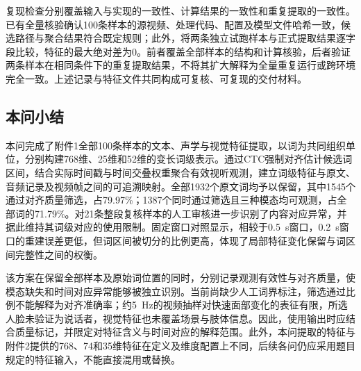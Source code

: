 复现检查分别覆盖输入与实现的一致性、计算结果的一致性和重复提取的一致性。已有全量核验确认100条样本的源视频、处理代码、配置及模型文件哈希一致，候选路径与聚合结果符合既定规则；此外，将两条独立试跑样本与正式提取结果逐字段比较，特征的最大绝对差为0。前者覆盖全部样本的结构和计算核验，后者验证两条样本在相同条件下的重复提取结果，不将其扩大解释为全量重复运行或跨环境完全一致。上述记录与特征文件共同构成可复核、可复现的交付材料。

\subsection{本问小结}

本问完成了附件1全部100条样本的文本、声学与视觉特征提取，以词为共同组织单位，分别构建768维、25维和52维的变长词级表示。通过CTC强制对齐估计候选词区间，结合实际时间戳与时间交叠权重聚合有效视听观测，建立词级特征与原文、音频记录及视频帧之间的可追溯映射。全部1932个原文词均予以保留，其中1545个通过对齐质量筛选，占79.97\%；1387个同时通过筛选且三种模态均可观测，占全部词的71.79\%。对21条整段复核样本的人工审核进一步识别了内容对应异常，并据此维持其词级对应的使用限制。固定窗口对照显示，相较于0.5~s窗口，0.2~s窗口的重建误差更低，但词区间被切分的比例更高，体现了局部特征变化保留与词区间完整性之间的权衡。

该方案在保留全部样本及原始词位置的同时，分别记录观测有效性与对齐质量，使模态缺失和时间对应异常能够被独立识别。当前尚缺少人工词界标注，筛选通过比例不能解释为对齐准确率；约5~Hz的视频抽样对快速面部变化的表征有限，所选人脸未验证为说话者，视觉特征也未覆盖场景与肢体信息。因此，使用输出时应结合质量标记，并限定对特征含义与时间对应的解释范围。此外，本问提取的特征与附件2提供的768、74和35维特征在定义及维度配置上不同，后续各问仍应采用题目规定的特征输入，不能直接混用或替换。
